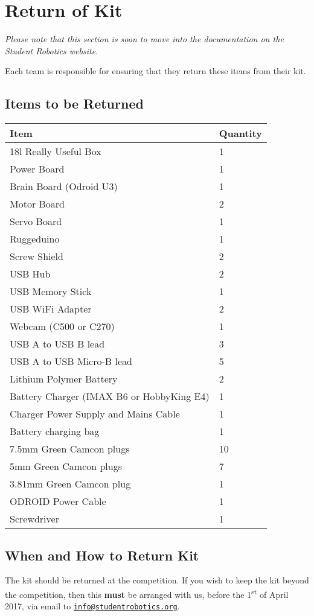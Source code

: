 \section {Return of Kit}
\label{sec:kit-return}

\textit{Please note that this section is soon to move into the documentation on the Student Robotics website.}

Each team is responsible for ensuring that they return these items from their kit.

\subsection {Items to be Returned}

\begin{tabular}{ll}
 \toprule
 \textbf{Item} & \textbf{Quantity} \\
 \midrule
 18l Really Useful Box & 1 \\

 Power Board & 1 \\
 Brain Board (Odroid U3) & 1 \\
 Motor Board & 2 \\
 Servo Board & 1 \\
 Ruggeduino & 1 \\
 Screw Shield & 2 \\

 USB Hub & 2 \\
 USB Memory Stick & 1 \\
 USB WiFi Adapter & 2 \\
 Webcam (C500 or C270) & 1 \\
 USB A to USB B lead & 3 \\
 USB A to USB Micro-B lead & 5 \\

 Lithium Polymer Battery & 2 \\
 Battery Charger (IMAX B6 or HobbyKing E4) & 1 \\
 Charger Power Supply and Mains Cable & 1 \\
 Battery charging bag & 1 \\

 7.5mm Green Camcon plugs & 10 \\
 5mm Green Camcon plugs & 7 \\
 3.81mm Green Camcon plug & 1 \\
 ODROID Power Cable & 1 \\
 Screwdriver & 1 \\
 \bottomrule
\end{tabular}

\subsection {When and How to Return Kit}

The kit should be returned at the competition.
If you wish to keep the kit beyond the competition, then this \textbf{must} be arranged with us,
 before the 1\textsuperscript{st} of April 2017, via email to \href{mailto:info@studentrobotics.org}{\nolinkurl{info@studentrobotics.org}}.

